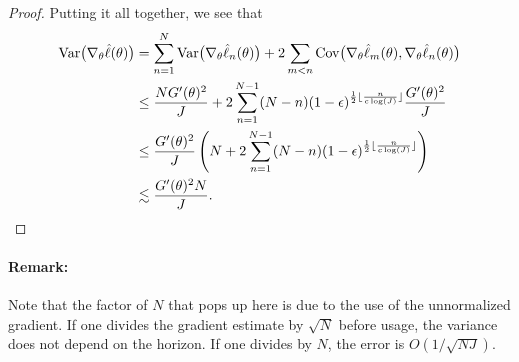 \begin{proof}
Putting it all together, we see that
\begin{align}
    \mathrm{Var}\big(\nabla_\theta \hat\ell(\theta)\big) &= \sum_{n=1}^N \mathrm{Var}\big(\nabla_\theta\hat\ell_n(\theta)\big) + 2\sum_{m<n} \mathrm{Cov}\big(\nabla_\theta\hat\ell_m(\theta),\nabla_\theta\hat\ell_n(\theta)\big)\\
    &\leq \frac{NG'(\theta)^2}{J} + 2\sum_{n=1}^{N-1} (N-n)(1-\epsilon)^{\frac{1}{2}\lfloor \frac{n}{c\log(J)} \rfloor}\frac{G'(\theta)^2}{J} \\
    &\leq \frac{G'(\theta)^2}{J} \left(N + 2\sum_{n=1}^{N-1} (N-n) (1-\epsilon)^{\frac{1}{2}\lfloor \frac{n}{c\log(J)} \rfloor}\right) \\
    &\lesssim \frac{G'(\theta)^2N}{J}.
\end{align}
\end{proof}


\paragraph{Remark:} Note that the factor of $N$ that pops up here is due to the use of the unnormalized gradient. If one divides the gradient estimate by $\sqrt{N}$ before usage, the variance does not depend on the horizon. If one divides by $N$, the error is $O(1/\sqrt{NJ})$.